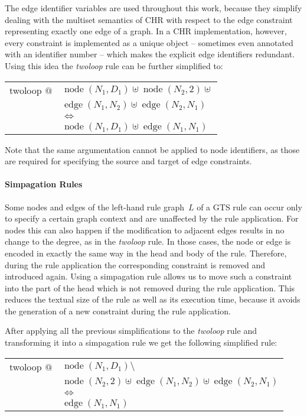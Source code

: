 \documentclass{tlp}
\DeclareMathOperator{\node}{node}
\DeclareMathOperator{\edge}{edge}
\begin{document}
The edge identifier variables are used throughout this work, because they
simplify dealing with the multiset semantics of CHR with respect to the edge
constraint representing exactly one edge of a graph. In a CHR implementation,
however, every constraint is implemented as a unique object -- sometimes even
annotated with an identifier number -- which makes the explicit edge identifiers
redundant. Using this idea the \emph{twoloop} rule can be further simplified to:

\begin{center} 
\begin{tabular}{ll} 
twoloop $@$ & $\node(N_1, D_1) \uplus \node(N_2, 2) \uplus$\\
& $\edge(N_1, N_2) \uplus \edge(N_2, N_1)$\\
& $\Leftrightarrow$\\
& $\node(N_1, D_1) \uplus \edge(N_1, N_1)$
\end{tabular}
\end{center}

Note that the same argumentation cannot be applied to node identifiers, as those
are required for specifying the source and target of edge constraints.

\paragraph{Simpagation Rules}

Some nodes and edges of the left-hand rule graph~$L$ of a GTS rule can occur only
to specify a certain graph context and are unaffected by the rule application.
For nodes this can also happen if the modification to adjacent edges results in
no change to the degree, as in the \emph{twoloop} rule. In those cases, the node
or edge is encoded in exactly the same way in the head and body of the rule.
Therefore, during the rule application the corresponding constraint is removed
and introduced again. Using a simpagation rule allows us to move such a
constraint into the part of the head which is not removed during the rule
application. This reduces the textual size of the rule as well as its execution
time, because it avoids the generation of a new constraint during the rule
application.

After applying all the previous simplifications to the \emph{twoloop} rule and
transforming it into a simpagation rule we get the following simplified rule:

\begin{center} 
\begin{tabular}{ll} 
twoloop $@$ & $\node(N_1, D_1) \setminus$\\
& $\node(N_2, 2) \uplus \edge(N_1, N_2) \uplus \edge(N_2, N_1)$\\
& $\Leftrightarrow$\\
& $\edge(N_1, N_1)$
\end{tabular}
\end{center}
\end{document}
